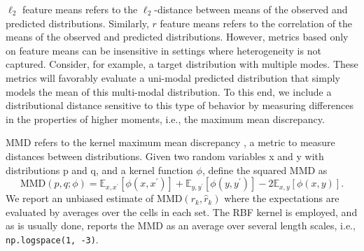 $\ell_2$ feature means refers to the $\ell_2$-distance between means of the observed and predicted distributions. Similarly, $r$ feature means refers to the correlation of the means of the observed and predicted distributions.
However, metrics based only on feature means can be insensitive in settings where heterogeneity is not captured. Consider, for example, a target distribution with multiple modes. These metrics will favorably evaluate a uni-modal predicted distribution that simply models the mean of this multi-modal distribution. To this end, we include a distributional distance sensitive to this type of behavior by measuring differences in the properties of higher moments, i.e., the maximum mean discrepancy.

MMD refers to the kernel maximum mean discrepancy \citep{gretton2012kernel}, a metric to measure distances between distributions.
Given two random variables x and y with distributions p and q, and a kernel function $\phi$, \citet{gretton2012kernel} define the squared MMD as
\begin{equation*}
    \text{MMD}(p, q; \phi) = \mathbb{E}_{x,x^\prime}[\phi(x, x^\prime)] + \mathbb{E}_{y,y^\prime}[\phi(y, y^\prime)] - 2\mathbb{E}_{x,y}[\phi(x, y)].
\end{equation*}
We report an unbiased estimate of $\text{MMD}(r_k, \hat{r}_k)$ where the expectations are evaluated by averages over the cells in each set. The RBF kernel is employed, and as is usually done, reports the MMD as an average over several length scales, i.e., \texttt{np.logspace(1, -3)}.


